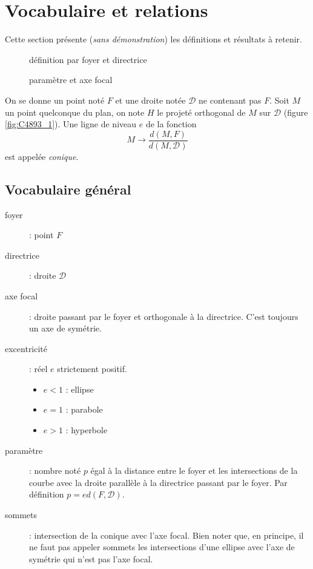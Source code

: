 

\section{Vocabulaire et relations}
Cette section présente (\emph{sans démonstration}) les définitions et résultats à retenir.
\begin{figure}[ht]
  \hfill
  \begin{minipage}{.5\linewidth}
    
    \caption{définition par foyer et directrice}
    \label{fig:C4893_1}
  \end{minipage}
  \hfill
  \begin{minipage}{.4\linewidth}
    
    \caption{paramètre et axe focal}
    \label{fig:C4893_2}
  \end{minipage}
  \hfill
\end{figure}

On se donne un point noté $F$ et une droite notée $\mathcal D$ ne contenant pas $F$. Soit $M$ un point quelconque du plan, on note $H$ le projeté orthogonal de $M$ sur $\mathcal D$ (figure \ref{fig:C4893_1}). Une ligne de niveau $e$ de la fonction
\begin{displaymath}
 M \rightarrow \dfrac{d(M,F)}{d(M,\mathcal D)}
\end{displaymath}
est appelée \emph{conique}.

\subsection{Vocabulaire général}
\begin{description}
 \item[foyer] : point $F$
\item[directrice] : droite $\mathcal D$
\item[axe focal] : droite passant par le foyer et orthogonale à la directrice. C'est toujours un axe de symétrie.
\item[excentricité] : réel $e$ strictement positif.
  \begin{itemize}
 \item $e<1$ : ellipse
\item  $e=1$ : parabole
\item $e>1$ : hyperbole
\end{itemize}
\item[paramètre] :  nombre noté $p$ égal à la distance entre le foyer et les intersections de la courbe avec la droite parallèle à la directrice passant par le foyer. Par définition $p=e d(F,\mathcal D)$.
\item[sommets] : intersection de la conique avec l'axe focal. Bien noter que, en principe, il ne faut pas appeler sommets les intersections d'une ellipse avec l'axe de symétrie qui n'est pas l'axe focal.
\end{description}

